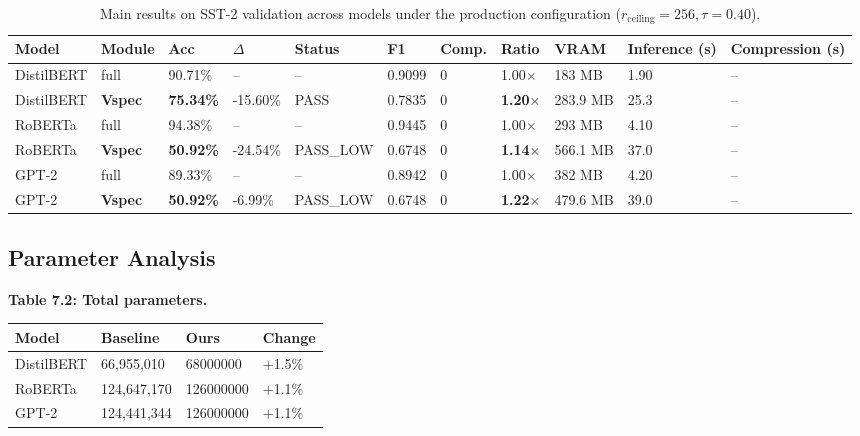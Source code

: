 \begin{table}[t]
\centering
\small
\begin{tabular}{lllllllllll}
\toprule
\textbf{Model} & \textbf{Module} & \textbf{Acc} & \textbf{$\Delta$} & \textbf{Status} & \textbf{F1} & \textbf{Comp.} & \textbf{Ratio} & \textbf{VRAM} & \textbf{Inference (s)} & \textbf{Compression (s)} \\
\midrule
DistilBERT & full & 90.71\% & -- & -- & 0.9099 & 0 & 1.00$\times$ & 183 MB & 1.90 & -- \\
DistilBERT & \textbf{Vspec} & \textbf{75.34\%} & -15.60\% & PASS & 0.7835 & 0 & \textbf{1.20$\times$} & 283.9 MB & 25.3 & -- \\
RoBERTa & full & 94.38\% & -- & -- & 0.9445 & 0 & 1.00$\times$ & 293 MB & 4.10 & -- \\
RoBERTa & \textbf{Vspec} & \textbf{50.92\%} & -24.54\% & PASS_LOW & 0.6748 & 0 & \textbf{1.14$\times$} & 566.1 MB & 37.0 & -- \\
GPT-2 & full & 89.33\% & -- & -- & 0.8942 & 0 & 1.00$\times$ & 382 MB & 4.20 & -- \\
GPT-2 & \textbf{Vspec} & \textbf{50.92\%} & -6.99\% & PASS_LOW & 0.6748 & 0 & \textbf{1.22$\times$} & 479.6 MB & 39.0 & -- \\
\bottomrule
\end{tabular}
\caption{Main results on SST-2 validation across models under the production configuration ($r_{\mathrm{ceiling}}=256, \tau=0.40$).}
\label{tab:main_sst2}
\end{table}

\subsection{Parameter Analysis}

\textbf{Table 7.2: Total parameters.}

\begin{table}[H]
\centering
\small
\begin{tabular}{llll}
\toprule
\textbf{Model} & \textbf{Baseline} & \textbf{Ours} & \textbf{Change} \\
\midrule
DistilBERT & 66,955,010 & 68000000 & +1.5\% \\
RoBERTa & 124,647,170 & 126000000 & +1.1\% \\
GPT-2 & 124,441,344 & 126000000 & +1.1\% \\
\bottomrule
\end{tabular}
\end{table}

